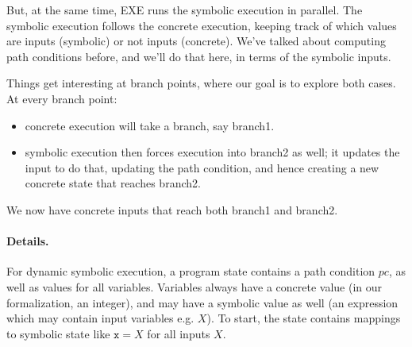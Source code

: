 \documentclass[11pt]{article}
\begin{document}
But, at the same time, EXE runs the symbolic execution in parallel. The symbolic execution follows the concrete execution,
keeping track of which values are inputs (symbolic) or not inputs (concrete). We've talked about computing path conditions
before, and we'll do that here, in terms of the symbolic inputs.

Things get interesting at branch points, where our goal is to explore both cases. At every branch point:
\begin{itemize}[noitemsep]
\item concrete execution will take a branch, say branch1.
\item symbolic execution then forces execution into branch2 as well; it updates the input to do that, updating the path condition, and hence creating a new concrete state that reaches branch2.
\end{itemize}
We now have concrete inputs that reach both branch1 and branch2.

\paragraph{Details.} For dynamic symbolic execution, a program state contains a path condition $\mathit{pc}$, as well as values for all variables.
Variables always have a concrete value (in our formalization, an integer), and may have a symbolic value as well (an expression which may contain
input variables e.g. $X$). To start, the state contains mappings to symbolic state like $\mathtt{x}=X$ for all inputs $X$.
\end{document}
